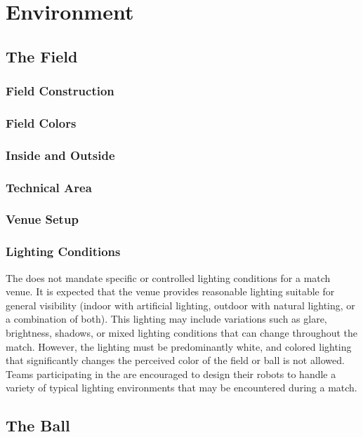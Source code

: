 \section{Environment}
\label{sec:environment}

\subsection{The Field}
\label{sec:field}

\subsubsection{Field Construction}
\subsubsection{Field Colors}
\subsubsection{Inside and Outside}
\subsubsection{Technical Area}
\subsubsection{Venue Setup}
\subsubsection{Lighting Conditions}
The \leaguenameabbr does not mandate specific or controlled lighting conditions for a match venue. It is expected that the venue provides reasonable lighting  suitable for general visibility (\eg indoor with artificial lighting, outdoor with natural lighting, or a combination of both). This lighting may include variations such as glare, brightness, shadows, or mixed lighting conditions that can change throughout the match. However, the lighting must be predominantly white, and colored lighting that significantly changes the perceived color of the field or ball is not allowed. Teams participating in the \leaguenameabbr are encouraged to design their robots to handle a variety of typical lighting environments that may be encountered during a match. 

\subsection{The Ball}
\label{sec:ball}
